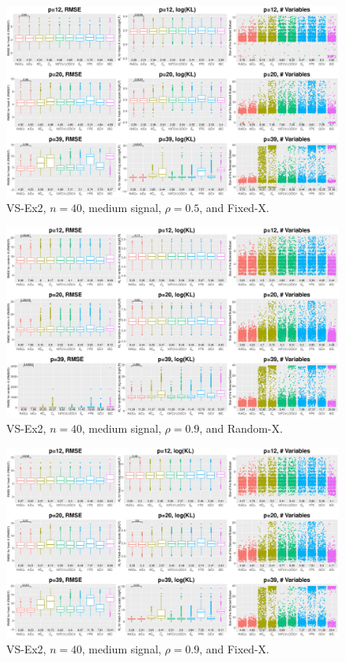 \begin{figure}[!ht]
\centering
\includegraphics[width=\textwidth]{figures/supplement/fixedx_VS-Ex2_n40_msnr_rho05.eps}
\caption{VS-Ex2, $n=40$, medium signal, $\rho=0.5$, and Fixed-X.}
\end{figure}
\clearpage
\begin{figure}[!ht]
\centering
\includegraphics[width=\textwidth]{figures/supplement/randomx_VS-Ex2_n40_msnr_rho09.eps}
\caption{VS-Ex2, $n=40$, medium signal, $\rho=0.9$, and Random-X.}
\end{figure}
\begin{figure}[!ht]
\centering
\includegraphics[width=\textwidth]{figures/supplement/fixedx_VS-Ex2_n40_msnr_rho09.eps}
\caption{VS-Ex2, $n=40$, medium signal, $\rho=0.9$, and Fixed-X.}
\end{figure}
